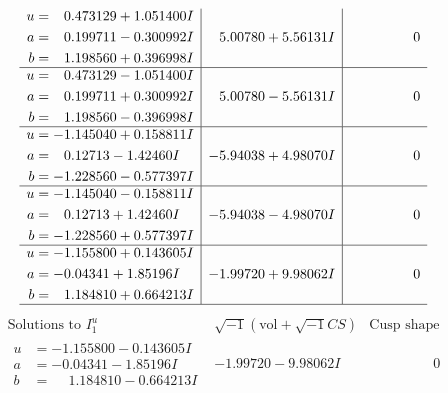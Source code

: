\documentclass[1p]{elsarticle_modified}
\theoremstyle{definition}
\newcommand{\I}{\sqrt{-1}}
\begin{document}
$$\begin{array}{c|c|c}
\begin{aligned}
u &= \phantom{-}0.473129 + 1.051400 I \\
a &= \phantom{-}0.199711 - 0.300992 I \\
b &= \phantom{-}1.198560 + 0.396998 I\end{aligned}
 & \phantom{-}5.00780 + 5.56131 I & \phantom{-0.000000 } 0 \\ \hline\begin{aligned}
u &= \phantom{-}0.473129 - 1.051400 I \\
a &= \phantom{-}0.199711 + 0.300992 I \\
b &= \phantom{-}1.198560 - 0.396998 I\end{aligned}
 & \phantom{-}5.00780 - 5.56131 I & \phantom{-0.000000 } 0 \\ \hline\begin{aligned}
u &= -1.145040 + 0.158811 I \\
a &= \phantom{-}0.12713 - 1.42460 I \\
b &= -1.228560 - 0.577397 I\end{aligned}
 & -5.94038 + 4.98070 I & \phantom{-0.000000 } 0 \\ \hline\begin{aligned}
u &= -1.145040 - 0.158811 I \\
a &= \phantom{-}0.12713 + 1.42460 I \\
b &= -1.228560 + 0.577397 I\end{aligned}
 & -5.94038 - 4.98070 I & \phantom{-0.000000 } 0 \\ \hline\begin{aligned}
u &= -1.155800 + 0.143605 I \\
a &= -0.04341 + 1.85196 I \\
b &= \phantom{-}1.184810 + 0.664213 I\end{aligned}
 & -1.99720 + 9.98062 I & \phantom{-0.000000 } 0\\
 \hline 
 \end{array}$$\newpage$$\begin{array}{c|c|c}  
\text{Solutions to }I^u_{1}& \I (\text{vol} + \sqrt{-1}CS) & \text{Cusp shape}\\
 \hline 
\begin{aligned}
u &= -1.155800 - 0.143605 I \\
a &= -0.04341 - 1.85196 I \\
b &= \phantom{-}1.184810 - 0.664213 I\end{aligned}
 & -1.99720 - 9.98062 I & \phantom{-0.000000 } 0 \\ \hline\begin{aligned}

\end{aligned}
\end{array}$$
\end{document}
